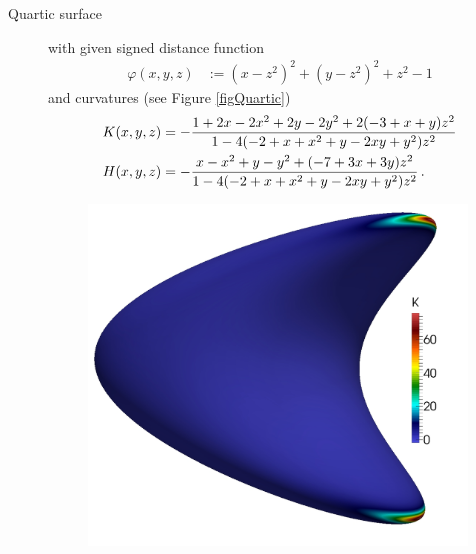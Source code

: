 \begin{description}
       \item[Quartic surface] with given signed distance function
            \begin{align}
              \label{eqQuartic}
              \varphi\left( x,y,z \right) &:= \left( x - z^{2} \right)^{2} + \left( y - z^{2} \right)^{2} + z^{2} - 1
            \end{align}
            and curvatures (see Figure \ref{figQuartic})
            {\footnotesize
            \begin{align}
              K(x,y,z) &= -\frac{1 + 2x - 2x^{2} + 2y - 2y^{2} + 2(-3 + x + y)z^{2}}
                          {1 - 4(-2 + x + x^{2} + y - 2xy + y^{2})z^{2}} \\
              H(x,y,z) &= -\frac{x - x^{2} + y - y^{2} + (-7 + 3x + 3y)z^{2}}
                         {1 - 4(-2 + x + x^{2} + y - 2xy + y^{2})z^{2}}\,\text{.}
            \end{align}
            }
  \begin{figure}
    \begin{minipage}[htp]{.23\textwidth}
      \centering
      \includegraphics[width=0.99\textwidth]{bilder/quartic/K.jpg}
    \end{minipage}\hfill
    \begin{minipage}[htp]{.23\textwidth}
      \centering

\end{minipage}
\end{figure}
\end{description}
